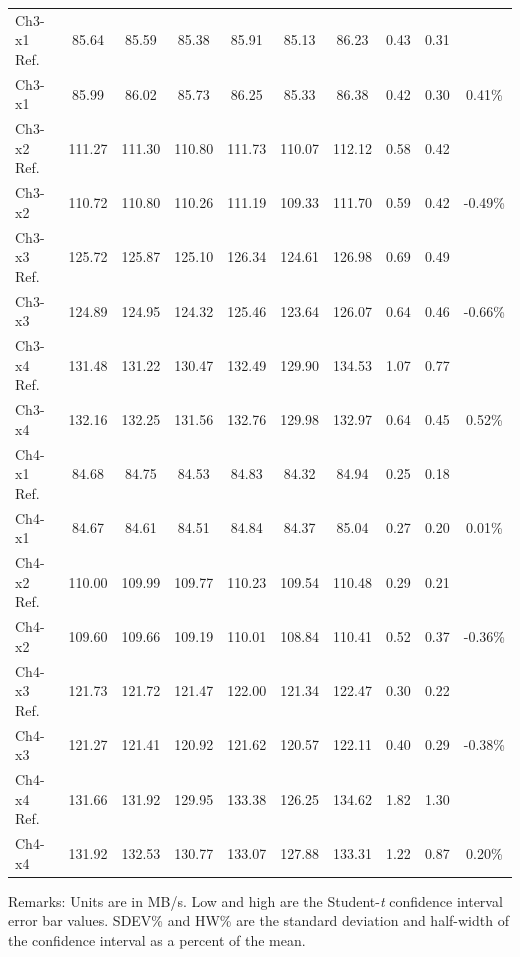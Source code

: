 \begin{table}[htbp]
\begin{center}
\begin{tabular}{
			l
			S[table-format=3.2]
			S[table-format=3.2]
			S[table-format=3.2]
			S[table-format=3.2]
			S[table-format=3.2]
			S[table-format=3.2]
			S[table-format=1.2]
			S[table-format=1.2]
			c}
		Ch3-x1 Ref. & 85.64 & 85.59 & 85.38 & 85.91 & 85.13 & 86.23 & 0.43 & 0.31 & \\
		Ch3-x1 & 85.99 & 86.02 & 85.73 & 86.25 & 85.33 & 86.38 & 0.42 & 0.30 & 0.41\% \\
		Ch3-x2 Ref. & 111.27 & 111.30 & 110.80 & 111.73 & 110.07 & 112.12 & 0.58 & 0.42 &\\
		Ch3-x2 & 110.72 & 110.80 & 110.26 & 111.19 & 109.33 & 111.70 & 0.59 & 0.42 & -0.49\% \\
		Ch3-x3 Ref. & 125.72 & 125.87 & 125.10 & 126.34 & 124.61 & 126.98 & 0.69 & 0.49 & \\
		Ch3-x3 & 124.89 & 124.95 & 124.32 & 125.46 & 123.64 & 126.07 & 0.64 & 0.46 & -0.66\% \\
		Ch3-x4 Ref. & 131.48 & 131.22 & 130.47 & 132.49 & 129.90 & 134.53 & 1.07 & 0.77 & \\
		Ch3-x4 & 132.16 & 132.25 & 131.56 & 132.76 & 129.98 & 132.97 & 0.64 & 0.45 & 0.52\% \\
		Ch4-x1 Ref. & 84.68 & 84.75 & 84.53 & 84.83 & 84.32 & 84.94 & 0.25 & 0.18 & \\
		Ch4-x1 & 84.67 & 84.61 & 84.51 & 84.84 & 84.37 & 85.04 & 0.27 & 0.20 & 0.01\% \\
		Ch4-x2 Ref. & 110.00 & 109.99 & 109.77 & 110.23 & 109.54 & 110.48 & 0.29 & 0.21 & \\
		Ch4-x2 & 109.60 & 109.66 & 109.19 & 110.01 & 108.84 & 110.41 & 0.52 & 0.37 & -0.36\% \\
		Ch4-x3 Ref. & 121.73 & 121.72 & 121.47 & 122.00 & 121.34 & 122.47 & 0.30 & 0.22 & \\
		Ch4-x3 & 121.27 & 121.41 & 120.92 & 121.62 & 120.57 & 122.11 & 0.40 & 0.29 & -0.38\% \\
		Ch4-x4 Ref. & 131.66 & 131.92 & 129.95 & 133.38 & 126.25 & 134.62 & 1.82 & 1.30 & \\
		Ch4-x4 & 131.92 & 132.53 & 130.77 & 133.07 & 127.88 & 133.31 & 1.22 & 0.87 & 0.20\% \\
			
		\bottomrule
	\end{tabular}
	\hspace*{-2cm}
	\end{center}
	
	Remarks: Units are in MB/s. Low and high are the Student-\textit{t} confidence interval error bar values. SDEV\% and HW\% are the standard deviation and half-width of the confidence interval as a percent of the mean.
\end{table}%

